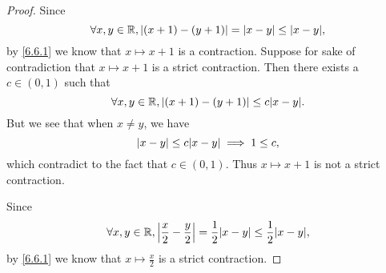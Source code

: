 \begin{proof}
  Since
  \[
    \forall x, y \in \R, \abs{(x + 1) - (y + 1)} = \abs{x - y} \leq \abs{x - y},
  \]
  by \cref{6.6.1} we know that \(x \mapsto x + 1\) is a contraction.
  Suppose for sake of contradiction that \(x \mapsto x + 1\) is a strict contraction.
  Then there exists a \(c \in (0, 1)\) such that
  \[
    \forall x, y \in \R, \abs{(x + 1) - (y + 1)} \leq c \abs{x - y}.
  \]
  But we see that when \(x \neq y\), we have
  \[
    \abs{x - y} \leq c \abs{x - y} \implies 1 \leq c,
  \]
  which contradict to the fact that \(c \in (0, 1)\).
  Thus \(x \mapsto x + 1\) is not a strict contraction.

  Since
  \[
    \forall x, y \in \R, \abs{\frac{x}{2} - \frac{y}{2}} = \frac{1}{2} \abs{x - y} \leq \frac{1}{2} \abs{x - y},
  \]
  by \cref{6.6.1} we know that \(x \mapsto \frac{x}{2}\) is a strict contraction.


\end{proof}
